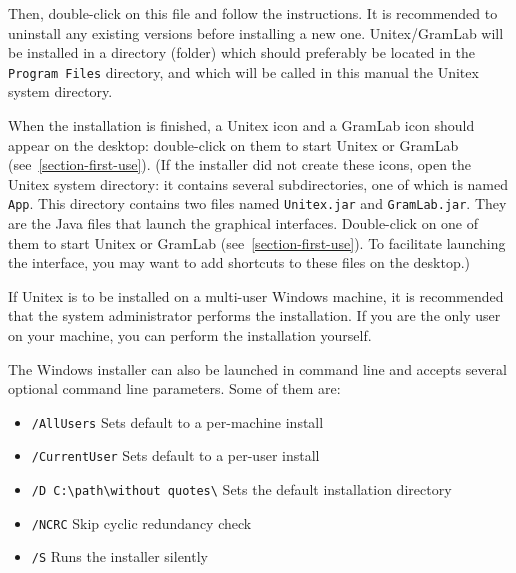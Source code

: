 \begin{flushleft}
{\tt \UnitexPackageWin{}}
{\tt \UnitexPackageWinSF{}}
\end{flushleft}

\noindent Then, double-click on this file and follow the instructions. It is recommended to uninstall any
existing versions before installing a new one. Unitex/GramLab will be installed in a directory
(folder) which should preferably be located in the \verb+Program Files+
directory, and which will be called in this manual the Unitex system directory.

\bigskip
\noindent When the installation is finished, a Unitex icon and a GramLab icon should appear on the desktop:
double-click on them to start Unitex or GramLab (see~\ref{section-first-use}).
(If the installer did not create these icons, open the Unitex system directory:
it contains several subdirectories, one  of which is named \verb+App+. This directory contains two files named
\verb+Unitex.jar+ and \verb+GramLab.jar+. They are the Java files that
launch the graphical interfaces. Double-click on one of them to start Unitex or GramLab
(see~\ref{section-first-use}). To facilitate launching the interface, you may want to add shortcuts
to these files on the desktop.)

\bigskip
\noindent If Unitex is to be installed on a multi-user Windows machine, it is recommended
that the system administrator performs the installation. If you are the only
user on your machine, you can perform the installation yourself.

\bigskip
\begin{samepage}
\noindent The Windows installer can also be launched in command line and accepts several optional
command line parameters. Some of them are:

\begin{itemize}
\itemsep1pt\parskip0pt
\item
  \texttt{/AllUsers} \hspace{.15in} Sets default to a per-machine install\\
\item
  \texttt{/CurrentUser} \hspace{.15in} Sets default to a per-user install\\
\item
  \texttt{/D C:\textbackslash{}path\textbackslash{}without quotes\textbackslash{}} \hspace{.15in}
  Sets the default installation directory\\
\item
  \texttt{/NCRC} \hspace{.15in} Skip cyclic redundancy check\\
\item
  \texttt{/S} \hspace{.15in} Runs the installer silently
\end{itemize}
\end{samepage}

